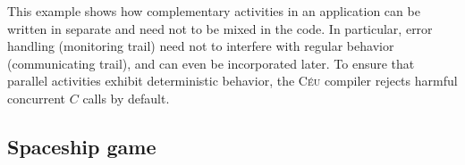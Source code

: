 \documentclass{sig-alternate}
\newcommand{\2}{\;\;}
\newcommand{\5}{\;\;\;\;\;}
\newcommand{\CEU}{\textsc{C\'{e}u}}
\newcommand{\code}[1] {{\small{\texttt{#1}}}}
\begin{document}

This example shows how complementary activities in an application can be 
written in separate and need not to be mixed in the code.
In particular, error handling (monitoring trail) need not to interfere with 
regular behavior (communicating trail), and can even be incorporated later.
To ensure that parallel activities exhibit deterministic behavior, the \CEU{} 
compiler rejects harmful concurrent $C$ calls by default.

\subsection{Spaceship game}
\end{document}
